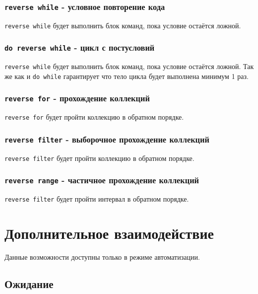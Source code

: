 \documentclass[a4paper, 14pt]{extarticle}
\begin{document}
\subsubsection{\lstinline|reverse while| - условное повторение кода}

\lstinline|reverse while| будет выполнить блок команд, пока условие остаётся ложной.

\subsubsection{\lstinline|do reverse while| - цикл с постусловий}

\lstinline|reverse while| будет выполнить блок команд, пока условие остаётся ложной. Так же как и \lstinline|do while| гарантирует что тело цикла будет выполнена минимум 1 раз.

\subsubsection{\lstinline|reverse for| - прохождение коллекций}

\lstinline|reverse for| будет пройти коллекцию в обратном порядке.

\subsubsection{\lstinline|reverse filter| - выборочное прохождение коллекций}

\lstinline|reverse filter| будет пройти коллекцию в обратном порядке.

\subsubsection{\lstinline|reverse range| - частичное прохождение коллекций}

\lstinline|reverse filter| будет пройти интервал в обратном порядке.

\section{Дополнительное взаимодействие}

Данные возможности доступны только в режиме автоматизации.

\subsection{Ожидание}
\end{document}
